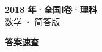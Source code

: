 \documentclass[zihao=-4, a4paper]{ctexart}
\begin{document}
\begin{center}
  {\Large\bfseries 2018 年·全国Ⅰ卷·理科}\\[4pt]
  {\large 数学 · 简答版}
\end{center}
\medskip
{}

\clearpage
{}
\begin{center}{\Large\bfseries 答案速查}\end{center}
\medskip

\end{document}
